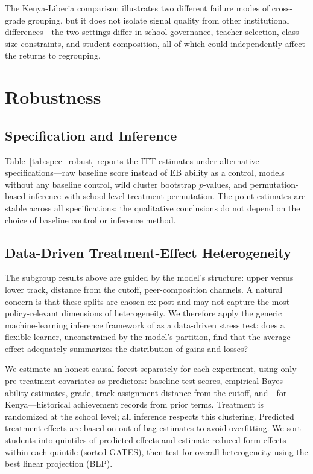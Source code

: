 \documentclass[11pt]{article}
\begin{document}
The Kenya-Liberia comparison illustrates two different failure modes of cross-grade grouping, but it does not isolate signal quality from other institutional differences---the two settings differ in school governance, teacher selection, class-size constraints, and student composition, all of which could independently affect the returns to regrouping.

\section{Robustness}
\label{sec:robustness}

\subsection{Specification and Inference}

Table~\ref{tab:spec_robust} reports the ITT estimates under alternative specifications---raw baseline score instead of EB ability as a control, models without any baseline control, wild cluster bootstrap $p$-values, and permutation-based inference with school-level treatment permutation. The point estimates are stable across all specifications; the qualitative conclusions do not depend on the choice of baseline control or inference method.

\subsection{Data-Driven Treatment-Effect Heterogeneity}

The subgroup results above are guided by the model's structure: upper versus lower track, distance from the cutoff, peer-composition channels. A natural concern is that these splits are chosen ex post and may not capture the most policy-relevant dimensions of heterogeneity. We therefore apply the generic machine-learning inference framework of \cite{chernozhukov2025fisher} as a data-driven stress test: does a flexible learner, unconstrained by the model's partition, find that the average effect adequately summarizes the distribution of gains and losses?

We estimate an honest causal forest \citep{wager_estimation_2018} separately for each experiment, using only pre-treatment covariates as predictors: baseline test scores, empirical Bayes ability estimates, grade, track-assignment distance from the cutoff, and---for Kenya---historical achievement records from prior terms. Treatment is randomized at the school level; all inference respects this clustering. Predicted treatment effects are based on out-of-bag estimates to avoid overfitting. We sort students into quintiles of predicted effects and estimate reduced-form effects within each quintile (sorted GATES), then test for overall heterogeneity using the best linear projection (BLP).
\end{document}
